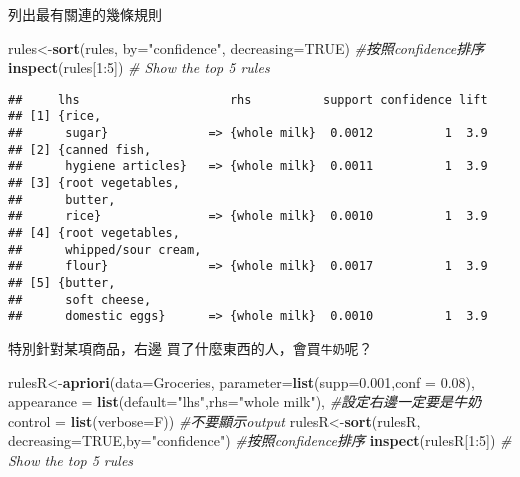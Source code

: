 \documentclass[]{book}
\newenvironment{Shaded}{\begin{snugshade}}{\end{snugshade}}
\newcommand{\KeywordTok}[1]{\textcolor[rgb]{0.13,0.29,0.53}{\textbf{{#1}}}}
\newcommand{\DataTypeTok}[1]{\textcolor[rgb]{0.13,0.29,0.53}{{#1}}}
\newcommand{\DecValTok}[1]{\textcolor[rgb]{0.00,0.00,0.81}{{#1}}}
\newcommand{\FloatTok}[1]{\textcolor[rgb]{0.00,0.00,0.81}{{#1}}}
\newcommand{\StringTok}[1]{\textcolor[rgb]{0.31,0.60,0.02}{{#1}}}
\newcommand{\CommentTok}[1]{\textcolor[rgb]{0.56,0.35,0.01}{\textit{{#1}}}}
\newcommand{\OtherTok}[1]{\textcolor[rgb]{0.56,0.35,0.01}{{#1}}}
\newcommand{\NormalTok}[1]{{#1}}
\begin{document}
列出最有關連的幾條規則

\begin{Shaded}
\begin{Highlighting}[]
\NormalTok{rules<-}\KeywordTok{sort}\NormalTok{(rules, }\DataTypeTok{by=}\StringTok{"confidence"}\NormalTok{, }\DataTypeTok{decreasing=}\OtherTok{TRUE}\NormalTok{) }\CommentTok{#按照confidence排序}
\KeywordTok{inspect}\NormalTok{(rules[}\DecValTok{1}\NormalTok{:}\DecValTok{5}\NormalTok{]) }\CommentTok{# Show the top 5 rules}
\end{Highlighting}
\end{Shaded}

\begin{verbatim}
##     lhs                     rhs          support confidence lift
## [1] {rice,                                                      
##      sugar}              => {whole milk}  0.0012          1  3.9
## [2] {canned fish,                                               
##      hygiene articles}   => {whole milk}  0.0011          1  3.9
## [3] {root vegetables,                                           
##      butter,                                                    
##      rice}               => {whole milk}  0.0010          1  3.9
## [4] {root vegetables,                                           
##      whipped/sour cream,                                        
##      flour}              => {whole milk}  0.0017          1  3.9
## [5] {butter,                                                    
##      soft cheese,                                               
##      domestic eggs}      => {whole milk}  0.0010          1  3.9
\end{verbatim}

特別針對某項商品，右邊 買了什麼東西的人，會買\texttt{牛奶}呢？

\begin{Shaded}
\begin{Highlighting}[]
\NormalTok{rulesR<-}\KeywordTok{apriori}\NormalTok{(}\DataTypeTok{data=}\NormalTok{Groceries, }\DataTypeTok{parameter=}\KeywordTok{list}\NormalTok{(}\DataTypeTok{supp=}\FloatTok{0.001}\NormalTok{,}\DataTypeTok{conf =} \FloatTok{0.08}\NormalTok{),}
        \DataTypeTok{appearance =} \KeywordTok{list}\NormalTok{(}\DataTypeTok{default=}\StringTok{"lhs"}\NormalTok{,}\DataTypeTok{rhs=}\StringTok{"whole milk"}\NormalTok{), }\CommentTok{#設定右邊一定要是牛奶}
        \DataTypeTok{control =} \KeywordTok{list}\NormalTok{(}\DataTypeTok{verbose=}\NormalTok{F)) }\CommentTok{#不要顯示output}
\NormalTok{rulesR<-}\KeywordTok{sort}\NormalTok{(rulesR, }\DataTypeTok{decreasing=}\OtherTok{TRUE}\NormalTok{,}\DataTypeTok{by=}\StringTok{"confidence"}\NormalTok{) }\CommentTok{#按照confidence排序}
\KeywordTok{inspect}\NormalTok{(rulesR[}\DecValTok{1}\NormalTok{:}\DecValTok{5}\NormalTok{]) }\CommentTok{# Show the top 5 rules}
\end{Highlighting}
\end{Shaded}
\end{document}

